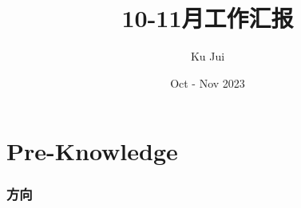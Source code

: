 \documentclass[a4paper, 10pt]{article}
\begin{document}
	
	
	\title{\songti {}10-11月工作汇报}
	\author{\textrm{Ku Jui}}
	\date{\textrm{Oct - Nov 2023}}
	\maketitle
	
	\renewcommand{\figurename}{Figure} %
	
	\renewcommand{\tablename}{Table}
	
	\renewcommand{\cfttoctitlefont}{\hfill\Large\bfseries\songti}
	\renewcommand{\cftaftertoctitle}{\hfill}
	\renewcommand{\contentsname}{Content}
		
	\tableofcontents
	
	
	\part{Pre-Knowledge}	
	
	\section{方向}
		
\end{document}
